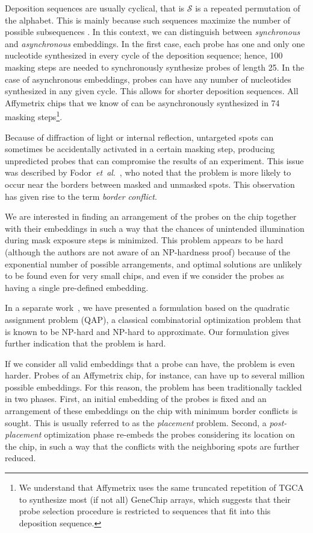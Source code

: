 \documentclass{llncs}
\begin{document}
Deposition sequences are usually cyclical, that is $\mathcal{S}$ is a repeated
permutation of the alphabet. This is mainly because such sequences maximize the
number of possible subsequences \cite{CHASE76}. In this context, we can
distinguish between \emph{synchronous} and \emph{asynchronous} embeddings. In
the first case, each probe has one and only one nucleotide synthesized in every
cycle of the deposition sequence; hence, 100 masking steps are needed to
synchronously synthesize probes of length 25. In the case of asynchronous
embeddings, probes can have any number of nucleotides synthesized in any given
cycle. This allows for shorter deposition sequences. All Affymetrix chips that
we know of can be asynchronously synthesized in 74 masking steps\footnote{We
understand that Affymetrix uses the same truncated repetition of TGCA to
synthesize most (if not all) GeneChip arrays, which suggests that their probe
selection procedure is restricted to sequences that fit into this deposition
sequence.}.

Because of diffraction of light or internal reflection, untargeted spots can
sometimes be accidentally activated in a certain masking step, producing
unpredicted probes that can compromise the results of an experiment. This issue
was described by Fodor~{\it et~al}.~\cite{FODOR91}, who noted that the problem
is more likely to
occur near the borders between masked and unmasked spots. This observation has
given rise to the term \emph{border conflict}.

We are interested in finding an arrangement of the probes on the chip together
with their embeddings in such a way that the chances of unintended
illumination during mask exposure steps is minimized. This problem appears to
be hard (although the authors are not aware of an NP-hardness proof) because
of the exponential number of possible arrangements, and optimal solutions are
unlikely to be found even for very small chips, and even if we consider the probes
as having a single pre-defined embedding.

In a separate work~\cite{CARVALHO06}, we have presented a formulation based on
the quadratic assignment problem (QAP), a classical combinatorial optimization
problem that is known to be NP-hard and NP-hard to approximate. Our formulation
gives further indication that the problem is hard.

If we consider all valid embeddings that a probe can have, the problem is even
harder. Probes
of an Affymetrix chip, for instance, can have up to several million possible
embeddings. For this reason, the problem has been traditionally tackled in two
phases. First, an initial embedding of the probes is fixed and an arrangement of
these embeddings on the chip with minimum border conflicts is sought. This is
usually referred to as the \emph{placement} problem. Second, a \emph{post-placement}
optimization phase re-embeds the probes considering its location on the chip,
in such a way that the conflicts with the neighboring spots are further reduced.
\end{document}
